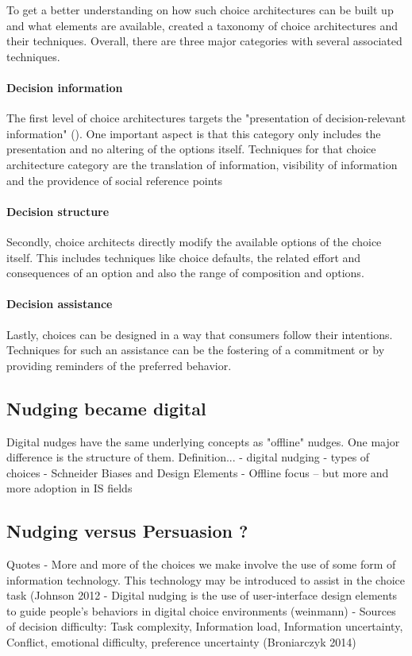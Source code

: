 To get a better understanding on how such choice architectures can be built up and what elements are available,  \cite{munscher_review_2016} created a taxonomy of choice architectures and their techniques. Overall, there are three major categories with several associated techniques. 
\paragraph{Decision information}
The first level of choice architectures targets the "presentation of decision-relevant information" (\cite{munscher_review_2016}). One important aspect is that this category only includes the presentation and no altering of the options itself. Techniques for that choice architecture category are the translation of information, visibility of information and the providence of social reference points
\paragraph{Decision structure}
Secondly, choice architects directly modify the available options of the choice itself. This includes techniques like choice defaults, the related effort and consequences of an option and also the range of composition and options.
\paragraph{Decision assistance}
Lastly, choices can be designed in a way that consumers follow their intentions. Techniques for such an assistance can be the fostering of a commitment or by providing reminders of the preferred behavior.

\subsection{Nudging became digital}
Digital nudges have the same underlying concepts as "offline" nudges. One major difference is the structure of them. 
Definition...
- digital nudging
- types of choices
- Schneider Biases and Design Elements
- Offline focus – but more and more adoption in IS fields


\subsection{Nudging versus Persuasion ?}



Quotes
- More and more of the choices we make involve the use of some form of information technology. This technology may be introduced to assist in the choice task (Johnson 2012
- Digital nudging is the use of user-interface design elements to guide people's behaviors in digital choice environments (weinmann)
- Sources of decision difficulty: Task complexity, Information load, Information uncertainty, Conflict, emotional difficulty, preference uncertainty (Broniarczyk 2014)
